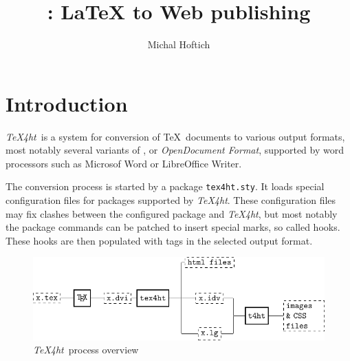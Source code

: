 \documentclass{ltugproc}
\author{Michal Hoftich}
\title{\texfourht: LaTeX to Web publishing}
\newcommand\term[1]{\textit{#1}}
\newcommand\packagename[1]{\texttt{#1.sty}}
\newcommand\texfourht{\term{\TeX4ht}}
\begin{document}
\maketitle

\section{Introduction}
\texfourht\ is a system for conversion of \TeX\ documents to various output
formats, most notably several variants of \HTML, or \term{OpenDocument
Format}, supported by word processors such as Microsof Word or LibreOffice
Writer. 



The conversion process is started by a package \packagename{tex4ht}. It loads special 
configuration files for packages supported by \texfourht. These configuration files may fix clashes between the configured package and \texfourht, but most notably the package commands
can be patched to insert special marks, so called hooks. These hooks
are then populated with tags in the selected output format. 


\begin{figure}[htp]
  \includegraphics[width=\textwidth]{img/tex4ht_process.pdf}
\caption{\texfourht\ process overview}
\label{fig:overview}
\end{figure}
\end{document}
